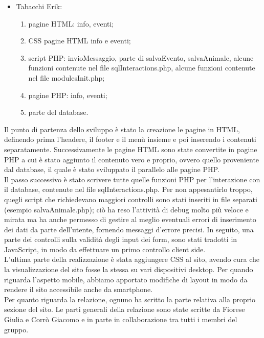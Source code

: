 \begin{itemize}
    \item Tabacchi Erik:
        \begin{enumerate}
            \item pagine HTML: info, eventi;
            \item CSS pagine HTML info e eventi;
            \item script PHP: invioMessaggio, parte di salvaEvento, salvaAnimale, alcune funzioni contenute nel file sqlInteractions.php, alcune funzioni contenute nel file modulesInit.php;
            \item pagine PHP: info, eventi;
            \item parte del database.
        \end{enumerate}
\end{itemize}
Il punto di partenza dello sviluppo è stato la creazione le pagine in HTML, definendo prima l'headere, il footer e il menù insieme e poi inserendo i contenuti separatamente. Successivamente le pagine HTML sono state convertite in pagine PHP a cui è stato aggiunto il contenuto vero e proprio, ovvero quello proveniente dal database, il quale è stato sviluppato il parallelo alle pagine PHP. \\
Il passo successivo è stato scrivere tutte quelle funzioni PHP per l'interazione con il database, contenute nel file sqlInteractions.php. Per non appesantirlo troppo, quegli script che richiedevano maggiori controlli sono stati inseriti in file separati (esempio salvaAnimale.php); ciò ha reso l'attività di debug molto più veloce e mirata ma ha anche permesso di gestire al meglio eventuali errori di inserimento dei dati da parte dell'utente, fornendo messaggi d'errore precisi.
In seguito, una parte dei controlli sulla validità degli input dei form, sono stati tradotti in JavaScript, in modo da effettuare un primo controllo client side.\\
L'ultima parte della realizzazione è stata aggiungere CSS al sito, avendo cura che la visualizzazione del sito fosse la stessa su vari dispositivi desktop. Per quando riguarda l'aspetto mobile, abbiamo apportato modifiche di layout in modo da rendere il sito accessibile anche da smartphone.\\
Per quanto riguarda la relazione, ognuno ha scritto la parte relativa alla proprio sezione del sito. Le parti generali della relazione sono state scritte da Fiorese Giulia e Corrò Giacomo e in parte in collaborazione tra tutti i membri del gruppo.
\pagebreak